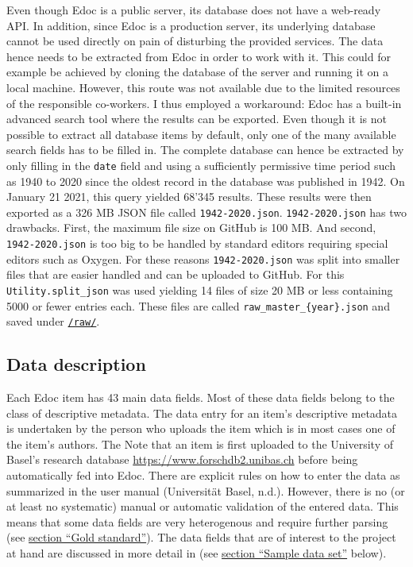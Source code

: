 Even though Edoc is a public server, its database does not have a
web-ready API. In addition, since Edoc is a production server, its
underlying database cannot be used directly on pain of disturbing the
provided services. The data hence needs to be extracted from Edoc in
order to work with it. This could for example be achieved by cloning the
database of the server and running it on a local machine. However, this
route was not available due to the limited resources of the responsible
co-workers. I thus employed a workaround: Edoc has a built-in advanced
search tool where the results can be exported. Even though it is not
possible to extract all database items by default, only one of the many
available search fields has to be filled in. The complete database can
hence be extracted by only filling in the \texttt{date} field and using
a sufficiently permissive time period such as 1940 to 2020 since the
oldest record in the database was published in 1942. On January 21 2021,
this query yielded 68'345 results. These results were then exported as a
326 MB JSON file called \texttt{1942-2020.json}. \texttt{1942-2020.json}
has two drawbacks. First, the maximum file size on GitHub is 100 MB. And
second, \texttt{1942-2020.json} is too big to be handled by standard
editors requiring special editors such as Oxygen. For these reasons
\texttt{1942-2020.json} was split into smaller files that are easier
handled and can be uploaded to GitHub. For this
\texttt{Utility.split\_json} was used yielding 14 files of size 20 MB or
less containing 5000 or fewer entries each. These files are called
\texttt{raw\_master\_\{year\}.json} and saved under
\href{https://github.com/MHindermann/mas/tree/main/files/raw}{\texttt{/raw/}}.

\hypertarget{data-description}{%
\subsection{Data description}\label{data-description}}

Each Edoc item has 43 main data fields. Most of these data fields belong
to the class of descriptive metadata. The data entry for an item's
descriptive metadata is undertaken by the person who uploads the item
which is in most cases one of the item's authors. The Note that an item
is first uploaded to the University of Basel's research database
\url{https://www.forschdb2.unibas.ch} before being automatically fed
into Edoc. There are explicit rules on how to enter the data as
summarized in the user manual (Universität Basel, n.d.). However, there
is no (or at least no systematic) manual or automatic validation of the
entered data. This means that some data fields are very heterogenous and
require further parsing (see \protect\hyperlink{gold-standard}{section
``Gold standard''}). The data fields that are of interest to the project
at hand are discussed in more detail in (see
\protect\hyperlink{sample-data-set}{section ``Sample data set''} below).

